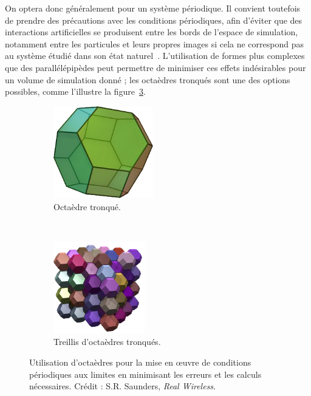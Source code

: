 	On optera donc généralement pour un système périodique. Il convient toutefois de prendre des précautions avec les conditions périodiques, afin d'éviter que des interactions \og artificielles \fg{} se produisent entre les \og bords \fg{} de l'espace de simulation, notamment entre les particules et leurs propres images si cela ne correspond pas au système étudié dans son état naturel~\cite{de1997effect}. L'utilisation de formes plus complexes que des parallélépipèdes peut permettre de minimiser ces effets indésirables pour un volume de simulation donné ; les octaèdres tronqués sont une des options possibles, comme l'illustre la figure~\ref{fig:octa}.
	
	\begin{figure}[!htbp]
		\begin{subfigure}{.49\textwidth}
			\centering
			\includegraphics[height=4cm]{./figures/ch1/truncOctahedron}
			\caption{Octaèdre tronqué.}
			\label{fig:truncOctahedron}
		\end{subfigure}
		~
		\begin{subfigure}{.49\textwidth}
			\centering
			\includegraphics[height=4cm]{./figures/ch1/truncOctahedra}
			\caption{Treillis d'octaèdres tronqués.}
			\label{fig:truncOctahedra}
		\end{subfigure}
		\caption[Octaèdres pour les conditions périodiques aux limites]{Utilisation d'octaèdres pour la mise en œuvre de conditions périodiques aux limites en minimisant les erreurs et les calculs nécessaires. Crédit : S.R. Saunders, \emph{Real Wireless}\footnotemark.}
		\label{fig:octa}
	\end{figure}
	
	
